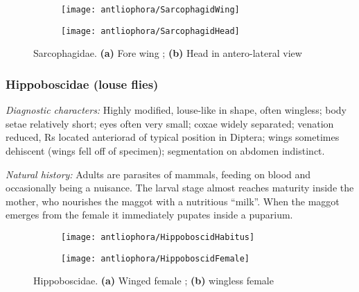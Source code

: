 \begin{figure}[ht!]
    \centering
    \begin{subfigure}[ht!]{0.5\textwidth}
        \texttt{[image: antliophora/SarcophagidWing]}
        \caption{}
        \label{fig:sarcoph1}
    \end{subfigure}
    \qquad
    \begin{subfigure}[ht!]{0.25\textwidth}
        \texttt{[image: antliophora/SarcophagidHead]}
        \caption{}
        \label{fig:sarcoph2}
    \end{subfigure}
    \caption{Sarcophagidae. \textbf{(a)} Fore wing \citep[][Fig. 116.30]{mcalpine1981manualv2}; \textbf{(b)} Head in antero-lateral view \citep[][Fig. 116.13]{mcalpine1981manualv2}}\label{fig:sarcophs}
\end{figure}

\subsubsection{Hippoboscidae (louse flies)}
\noindent{}\textit{Diagnostic characters:} Highly modified, louse-like in shape, often wingless; body setae relatively short; eyes often very small; coxae widely separated; venation reduced, Rs located anteriorad of typical position in Diptera; wings sometimes dehiscent (wings fell off of specimen); segmentation on abdomen indistinct.\vspace{3mm}

\noindent{}\textit{Natural history:} Adults are parasites of mammals, feeding on blood and occasionally being a nuisance. The larval stage almost reaches maturity inside the mother, who nourishes the maggot with a nutritious ``milk''. When the maggot emerges from the female it immediately pupates inside a puparium.\vspace{3mm}

\begin{figure}[ht!]
    \centering
    \begin{subfigure}[ht!]{0.5\textwidth}
        \texttt{[image: antliophora/HippoboscidHabitus]}
        \caption{}
        \label{fig:hippoboscid1}
    \end{subfigure}
    \qquad
    \begin{subfigure}[ht!]{0.35\textwidth}
        \texttt{[image: antliophora/HippoboscidFemale]}
        \caption{}
        \label{fig:hippoboscid2}
    \end{subfigure}
    \caption{Hippoboscidae. \textbf{(a)} Winged female \citep[][Fig. 111.1]{mcalpine1981manualv2}; \textbf{(b)} wingless female \citep[][Fig. 111.36]{mcalpine1981manualv2}}\label{fig:hippoboscids}
\end{figure}

